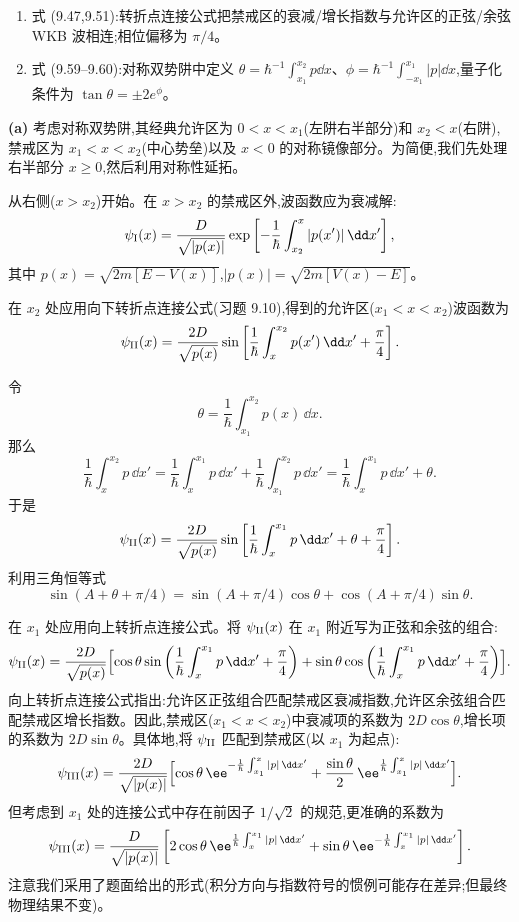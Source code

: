 \begin{question}
\par\smallskip
{}
\begin{enumerate}[leftmargin=2.2em,itemsep=0.12em,topsep=0.12em,parsep=0pt]
\item 式 (9.47,9.51):转折点连接公式把禁戒区的衰减/增长指数与允许区的正弦/余弦 WKB 波相连;相位偏移为 $\pi/4$。
\item 式 (9.59--9.60):对称双势阱中定义 $\theta=\hbar^{-1}\int_{x_1}^{x_2}p\dd x$、$\phi=\hbar^{-1}\int_{-x_1}^{x_1}|p|\dd x$,量子化条件为 $\tan\theta=\pm2e^\phi$。
\end{enumerate}

\begin{solution}
\textbf{(a)} 考虑对称双势阱,其经典允许区为 $0<x<x_1$(左阱右半部分)和 $x_2<x$(右阱),禁戒区为 $x_1<x<x_2$(中心势垒)以及 $x<0$ 的对称镜像部分。为简便,我们先处理右半部分 $x\ge0$,然后利用对称性延拓。

从右侧($x>x_2$)开始。在 $x>x_2$ 的禁戒区外,波函数应为衰减解:
\[
\psi_{\rm I}(x)=\frac{D}{\sqrt{|p(x)|}}\exp\left[-\frac{1}{\hbar}\int_{x_2}^{x}|p(x')|\,\dd x'\right],
\]
其中 $p(x)=\sqrt{2m[E-V(x)]}$,$|p(x)|=\sqrt{2m[V(x)-E]}$。

在 $x_2$ 处应用向下转折点连接公式(习题 9.10),得到的允许区($x_1<x<x_2$)波函数为
\[
\psi_{\rm II}(x)=\frac{2D}{\sqrt{p(x)}}\sin\left[\frac{1}{\hbar}\int_x^{x_2}p(x')\,\dd x'+\frac{\pi}{4}\right].
\]

令
\[
\theta=\frac{1}{\hbar}\int_{x_1}^{x_2}p(x)\,\dd x.
\]
那么
\[
\frac{1}{\hbar}\int_x^{x_2}p\,\dd x'
=\frac{1}{\hbar}\int_x^{x_1}p\,\dd x'+\frac{1}{\hbar}\int_{x_1}^{x_2}p\,\dd x'
=\frac{1}{\hbar}\int_x^{x_1}p\,\dd x'+\theta.
\]
于是
\[
\psi_{\rm II}(x)=\frac{2D}{\sqrt{p(x)}}
\sin\left[\frac{1}{\hbar}\int_x^{x_1}p\,\dd x'+\theta+\frac{\pi}{4}\right].
\]
利用三角恒等式
\[
\sin(A+\theta+\pi/4)=\sin(A+\pi/4)\cos\theta+\cos(A+\pi/4)\sin\theta.
\]

在 $x_1$ 处应用向上转折点连接公式。将 $\psi_{\rm II}(x)$ 在 $x_1$ 附近写为正弦和余弦的组合:
\[
\psi_{\rm II}(x)=\frac{2D}{\sqrt{p(x)}}
\Bigl[\cos\theta\sin\left(\frac{1}{\hbar}\int_x^{x_1}p\,\dd x'+\frac{\pi}{4}\right)
+\sin\theta\cos\left(\frac{1}{\hbar}\int_x^{x_1}p\,\dd x'+\frac{\pi}{4}\right)\Bigr].
\]
向上转折点连接公式指出:允许区正弦组合匹配禁戒区衰减指数,允许区余弦组合匹配禁戒区增长指数。因此,禁戒区($x_1<x<x_2$)中衰减项的系数为 $2D\cos\theta$,增长项的系数为 $2D\sin\theta$。具体地,将 $\psi_{\rm II}$ 匹配到禁戒区(以 $x_1$ 为起点):
\[
\psi_{\rm III}(x)=\frac{2D}{\sqrt{|p(x)|}}
\Bigl[\cos\theta\,\ee^{-\frac{1}{\hbar}\int_{x_1}^{x}|p|\,\dd x'}
+\frac{\sin\theta}{2}\,\ee^{\frac{1}{\hbar}\int_{x_1}^{x}|p|\,\dd x'}\Bigr].
\]
但考虑到 $x_1$ 处的连接公式中存在前因子 $1/\sqrt2$ 的规范,更准确的系数为
\[
\psi_{\rm III}(x)=\frac{D}{\sqrt{|p(x)|}}
\left[2\cos\theta\,\ee^{\frac{1}{\hbar}\int_{x}^{x_1}|p|\,\dd x'}
+\sin\theta\,\ee^{-\frac{1}{\hbar}\int_{x}^{x_1}|p|\,\dd x'}\right].
\]
注意我们采用了题面给出的形式(积分方向与指数符号的惯例可能存在差异;但最终物理结果不变)。


\end{solution}
\end{question}
